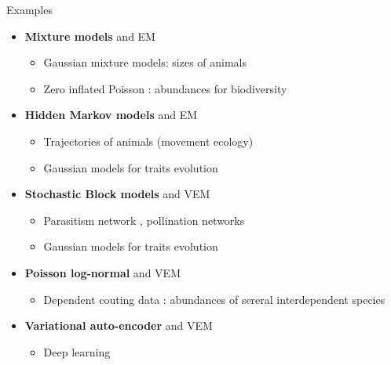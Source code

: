 \documentclass[compress,10pt]{beamer}
\begin{document}
\begin{frame}{Examples}
 

 \begin{itemize}
 \item \textbf{\color{dgreen} Mixture models} and EM 
  \begin{itemize}
  \item Gaussian mixture models: sizes of animals
  \item Zero inflated Poisson :  abundances for biodiversity
  \end{itemize}
\item \textbf{\color{dgreen} Hidden Markov models} and EM
 \begin{itemize}
  \item Trajectories of animals (movement ecology)
  \item Gaussian models for traits evolution 
  \end{itemize}
\item \textbf{\color{dgreen}  Stochastic Block models} and VEM 
   \begin{itemize}
  \item Parasitism network , pollination networks 
  \item Gaussian models for traits evolution
\end{itemize}

\item \textbf{\color{dgreen} Poisson log-normal} and VEM 
   \begin{itemize}
  \item Dependent couting data : abundances of sereral interdependent species
 \end{itemize}

 

 \item \textbf{\color{dgreen} Variational auto-encoder} and VEM 
   \begin{itemize}
  \item Deep learning  \end{itemize}

\end{itemize}
 

\end{frame}
\end{document}
